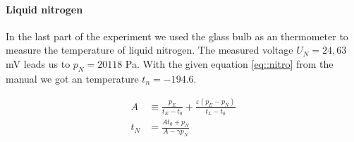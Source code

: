 \paragraph{Liquid nitrogen}
In the last part of the experiment we used the glass bulb as an thermometer to measure the temperature of liquid nitrogen.
The measured voltage $U_N = 24,63 $ \si{\milli\volt} leads us to $p_N=20118$ Pa. 
With the given equation \ref{eq::nitro} from the manual \cite{manual} we got an temperature $t_n = -194.6$.


\begin{equation}
\begin{aligned}
A & \equiv \frac{p_{E}}{t_{E}-t_{0}}+\frac{\varepsilon\left(p_{E}-p_{N}\right)}{t_{L}-t_{0}} \\
t_{N} &=\frac{A t_{0}+p_{N}}{A-\gamma p_{N}}
\end{aligned}
\label{eq::nitro}
\end{equation}





